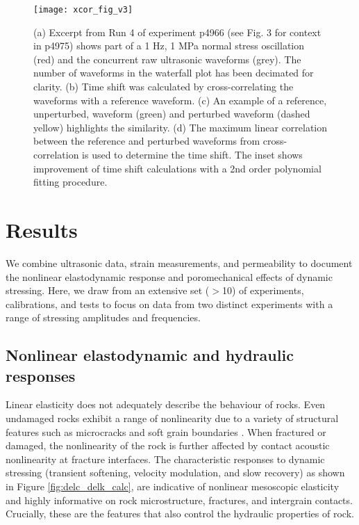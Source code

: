 \documentclass[draft]{agujournal2019}
\begin{document}
\begin{figure*}[ht]
	\centering
	\texttt{[image: xcor\_fig\_v3]}
	\caption[]{(a) Excerpt from Run 4 of experiment p4966 (see Fig. 3 for context in p4975) shows part of a 1 Hz, 1 MPa normal stress oscillation (red) and the concurrent raw ultrasonic waveforms (grey). The number of waveforms in the waterfall plot has been decimated for clarity. (b) Time shift was calculated by cross-correlating the waveforms with a reference waveform. (c) An example of a reference, unperturbed, waveform (green) and perturbed waveform (dashed yellow) highlights the similarity. (d) The maximum linear correlation between the reference and perturbed waveforms from cross-correlation is used to determine the time shift. The inset shows improvement of time shift calculations with a 2nd order polynomial fitting procedure.}
	\label{fig:xcor_poly}
\end{figure*}


\section{Results}
\label{results}
We combine ultrasonic data, strain measurements, and permeability to document the nonlinear elastodynamic response and poromechanical effects of dynamic stressing. Here, we draw from an extensive set ($>$10) of experiments, calibrations, and tests to focus on data from two distinct experiments with a range of stressing amplitudes and frequencies.

\subsection{Nonlinear elastodynamic and hydraulic responses}
\label{sec:results-nonlin_hydr_response}
Linear elasticity does not adequately describe the behaviour of rocks. Even undamaged rocks exhibit a range of nonlinearity due to a variety of structural features such as microcracks and soft grain boundaries \cite{Riviere15}. When fractured or damaged, the nonlinearity of the rock is further affected by contact acoustic nonlinearity at fracture interfaces. The characteristic responses to dynamic stressing (transient softening, velocity modulation, and slow recovery) as shown in Figure \ref{fig:delc_delk_calc}, are indicative of nonlinear mesoscopic elasticity \cite{Guyer09} and highly informative on rock microstructure, fractures, and intergrain contacts. Crucially, these are the features that also control the hydraulic properties of rock.
\end{document}

